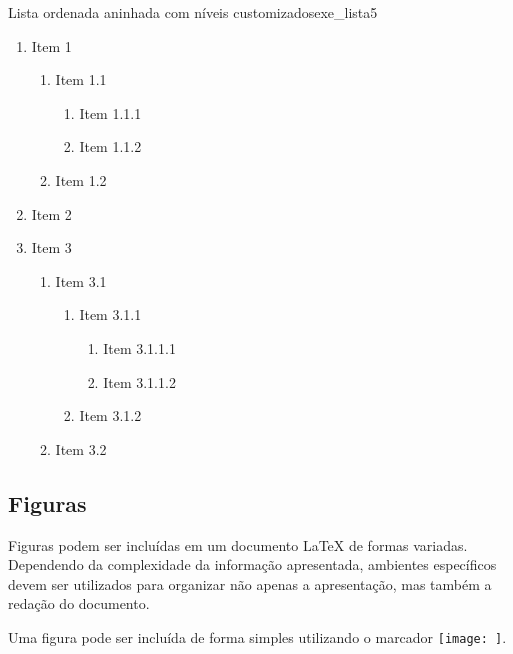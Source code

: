 \begin{texexptitled}[breakable,enhanced,middle=2mm]{Lista ordenada aninhada com níveis customizados}{exe_lista5}
\renewcommand{\labelenumi}{\arabic{enumi}}
\renewcommand{\labelenumii}{\alph{enumii}}
\renewcommand{\labelenumiii}{\roman{enumiii}}
\renewcommand{\labelenumiv}{\Alph{enumiv}}
\begin{enumerate}
    \item Item 1
    \begin{enumerate}
        \item Item 1.1
        \begin{enumerate}
            \item Item 1.1.1
            \item Item 1.1.2
        \end{enumerate}
        \item Item 1.2
    \end{enumerate}
    \item Item 2
    \item Item 3
    \begin{enumerate}
        \item Item 3.1
         \begin{enumerate}
            \item Item 3.1.1
            \begin{enumerate}
                \item Item 3.1.1.1
                \item Item 3.1.1.2
            \end{enumerate}
            \item Item 3.1.2
        \end{enumerate}
        \item Item 3.2
    \end{enumerate}
\end{enumerate}
\end{texexptitled}


\subsection{Figuras}%
\label{sec:figuras}

Figuras podem ser incluídas em um documento \LaTeX{} de formas variadas. Dependendo da complexidade da informação apresentada, ambientes específicos devem ser utilizados para organizar não apenas a apresentação, mas também a redação do documento.

Uma figura pode ser incluída de forma simples utilizando o marcador \texttt{\texttt{[image: ]}}.

